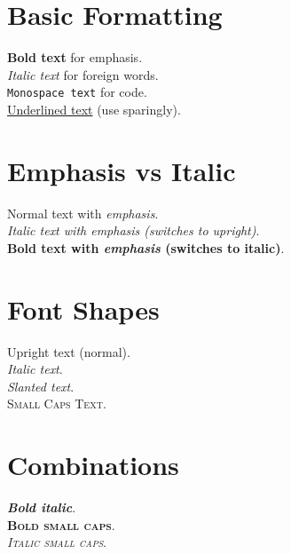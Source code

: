 \documentclass[12pt, a4paper]{article}
\begin{document}
\section*{Basic Formatting}
\textbf{Bold text} for emphasis. \\
\textit{Italic text} for foreign words. \\
\texttt{Monospace text} for code. \\
\underline{Underlined text} (use sparingly).

\section*{Emphasis vs Italic}
Normal text with \emph{emphasis}. \\
\textit{Italic text with \emph{emphasis} (switches to upright)}. \\
\textbf{Bold text with \emph{emphasis} (switches to italic)}.

\section*{Font Shapes}
\textup{Upright text} (normal). \\
\textit{Italic text}. \\
\textsl{Slanted text}. \\
\textsc{Small Caps Text}.

\section*{Combinations}
\textbf{\textit{Bold italic}}. \\
\textbf{\textsc{Bold small caps}}. \\
\textit{\textsc{Italic small caps}}.
\end{document}

